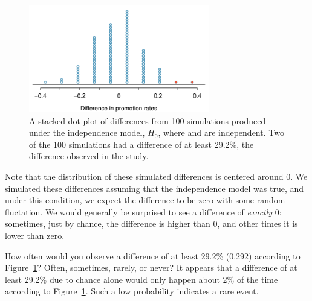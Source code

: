 \begin{figure}[ht]
\centering
\includegraphics[width=0.7\textwidth]{02/figures/discRandDotPlot/discRandDotPlot}
\caption{A stacked dot plot of differences from 100 simulations produced under the independence model, $H_0$, where  and  are independent. Two of the 100 simulations had a difference of at least 29.2\%, the difference observed in the study.}
\label{discRandDotPlot}
\end{figure}

Note that the distribution of these simulated differences is centered around 0. We simulated these differences assuming that the independence model was true, and under this condition, we expect the difference to be zero with some random fluctation. We would generally be surprised to see a difference of \emph{exactly} 0: sometimes, just by chance, the difference is higher than 0, and other times it is lower than zero.

\begin{example}{How often would you observe a difference of at least 29.2\% (0.292) according to Figure~\ref{discRandDotPlot}? Often, sometimes, rarely, or never?}
It appears that a difference of at least 29.2\% due to chance alone would only happen about 2\% of the time according to Figure~\ref{discRandDotPlot}. Such a low probability indicates a rare event.
\end{example}

